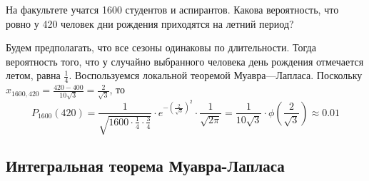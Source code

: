 \begin{exmp}
	На факультете учатся 1600 студентов и аспирантов. Какова вероятность, что ровно у 420 человек дни рождения приходятся на летний период?
	
	Будем предполагать, что все сезоны одинаковы по длительности. Тогда вероятность того, что у случайно выбранного человека день рождения отмечается летом, равна $\frac{1}{4}$. Воспользуемся локальной теоремой Муавра—Лапласа. Поскольку $x_{1600, 420} = \frac{420 - 400}{10 \sqrt{3}} = \frac{2}{\sqrt{3}}$, то
	\[ P_{1600} (420) = \frac{1}{\sqrt{1600 \cdot \frac{1}{4} \cdot \frac{3}{4}}} \cdot e^{- \left(\frac{2}{\sqrt{3}}\right)^2} \cdot \frac{1}{\sqrt{2 \pi}} = \frac{1}{10 \sqrt{3}} \cdot \phi \left( \frac{2}{\sqrt{3}} \right) \approx 0.01 \]
\end{exmp}

\subsection{Интегральная теорема Муавра-Лапласа}

